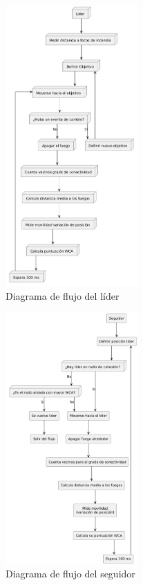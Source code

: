 \documentclass{article}
\begin{document}
\begin{figure}[H]
    \centering
    \includegraphics[width=0.45\textwidth]{DiagramaLider.png}
    \caption{Diagrama de flujo del líder}
    \label{fig:diagLead}
\end{figure}

\begin{figure}[H]
    \centering
    \includegraphics[width=0.45\textwidth]{DiagramaSeguidor.png}
    \caption{Diagrama de flujo del seguidor}
    \label{fig:diagFoll}
\end{figure}
\end{document}

